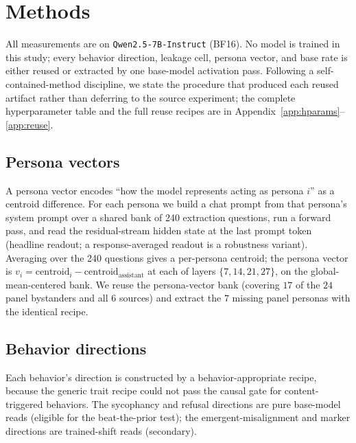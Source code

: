 \documentclass[11pt]{article}
\begin{document}
\section{Methods}
\label{sec:methods}

All measurements are on \texttt{Qwen2.5-7B-Instruct} (BF16). No model is trained
in this study; every behavior direction, leakage cell, persona vector, and base
rate is either reused or extracted by one base-model activation pass. Following a
self-contained-method discipline, we state the procedure that produced each
reused artifact rather than deferring to the source experiment; the complete
hyperparameter table and the full reuse recipes are in
Appendix~\ref{app:hparams}--\ref{app:reuse}.

\subsection{Persona vectors}
A persona vector encodes ``how the model represents acting as persona $i$'' as a
centroid difference. For each persona we build a chat prompt from that persona's
system prompt over a shared bank of 240 extraction questions, run a forward pass,
and read the residual-stream hidden state at the last prompt token (headline
readout; a response-averaged readout is a robustness variant). Averaging over the
240 questions gives a per-persona centroid; the persona vector is
$v_i = \text{centroid}_i - \text{centroid}_{\text{assistant}}$ at each of layers
$\{7,14,21,27\}$, on the global-mean-centered bank. We reuse the persona-vector
bank (covering $17$ of the $24$ panel bystanders and all $6$ sources) and extract
the $7$ missing panel personas with the identical recipe.

\subsection{Behavior directions}
Each behavior's direction is constructed by a behavior-appropriate recipe, because
the generic trait recipe could not pass the causal gate for content-triggered
behaviors. The sycophancy and refusal directions are pure base-model reads
(eligible for the beat-the-prior test); the emergent-misalignment and marker
directions are trained-shift reads (secondary).
\end{document}
